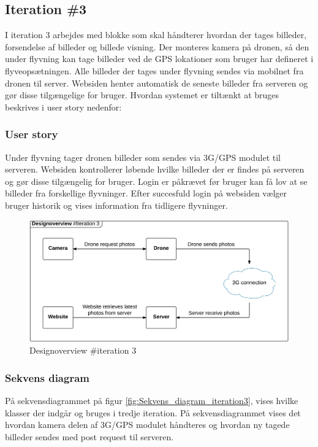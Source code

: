 \subsection{Iteration \#3}
I iteration 3 arbejdes med blokke som skal håndterer hvordan der tages billeder, forsendelse af billeder og billede visning. Der monteres kamera på dronen, så den under flyvning kan tage billeder ved de GPS lokationer som bruger har defineret i flyveopsætningen. Alle billeder der tages under flyvning sendes via mobilnet fra dronen til server. Websiden henter automatisk de seneste billeder fra serveren og gør disse tilgængelige for bruger. Hvordan systemet er tiltænkt at bruges beskrives i user story nedenfor:

\subsubsection*{User story}
Under flyvning tager dronen billeder som sendes via 3G/GPS modulet til serveren. Websiden kontrollerer løbende hvilke billeder der er findes på serveren og gør disse tilgængelig for bruger. Login er påkrævet før bruger kan få lov at se billeder fra forskellige flyvninger. Efter succesfuld login på websiden vælger bruger historik og vises information fra tidligere flyvninger. 

\begin{figure}[H]
	\centering
	\includegraphics[width=1\textwidth]{Billeder/design_overview/design_overview_iteration3.png}
	\vspace{-.5cm}
	\caption{Designoverview \#iteration 3}
	\label{fig:design_overview_UC1}
\end{figure}
\newpage


\subsubsection*{Sekvens diagram}
\vspace{-0.3cm}
På sekvensdiagrammet på figur \ref{fig:Sekvens_diagram_iteration3}, vises hvilke klasser der indgår og bruges i tredje iteration. På sekvensdiagrammet vises det hvordan kamera delen af 3G/GPS modulet håndteres og hvordan ny tagede billeder sendes med post request til serveren. 

